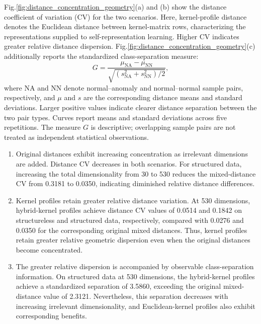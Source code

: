 \documentclass[ASNA,twocolumn]{USG} %
\begin{document}
Fig.\ref{fig:distance_concentration_geometry}(a) and (b) show the distance coefficient of variation (CV) for the two scenarios. Here, kernel-profile distance denotes the Euclidean distance between kernel-matrix rows, characterizing the representations supplied to self-representation learning. Higher CV indicates greater relative distance dispersion. Fig.\ref{fig:distance_concentration_geometry}(c) additionally reports the standardized class-separation measure:
\begin{equation*}
    G=
\frac{\mu_{\mathrm{NA}}-\mu_{\mathrm{NN}}}
{\sqrt{(s_{\mathrm{NA}}^2+s_{\mathrm{NN}}^2)/2}},
\end{equation*}
where NA and NN denote normal–anomaly and normal–normal sample pairs, respectively, and $\mu$ and $s$ are the corresponding distance means and standard deviations. Larger positive values indicate clearer distance separation between the two pair types. Curves report means and standard deviations across five repetitions. The measure $G$ is descriptive; overlapping sample pairs are not treated as independent statistical observations.

\begin{enumerate}
    \item Original distances exhibit increasing concentration as irrelevant dimensions are added. Distance CV decreases in both scenarios. For structured data, increasing the total dimensionality from 30 to 530 reduces the mixed-distance CV from 0.3181 to 0.0350, indicating diminished relative distance differences.

    \item Kernel profiles retain greater relative distance variation. At 530 dimensions, hybrid-kernel profiles achieve distance CV values of 0.0514 and 0.1842 on structureless and structured data, respectively, compared with 0.0276 and 0.0350 for the corresponding original mixed distances. Thus, kernel profiles retain greater relative geometric dispersion even when the original distances become concentrated.

    \item The greater relative dispersion is accompanied by observable class-separation information. On structured data at 530 dimensions, the hybrid-kernel profiles achieve a standardized separation of 3.5860, exceeding the original mixed-distance value of 2.3121. Nevertheless, this separation decreases with increasing irrelevant dimensionality, and Euclidean-kernel profiles also exhibit corresponding benefits. 
\end{enumerate}
\end{document}
